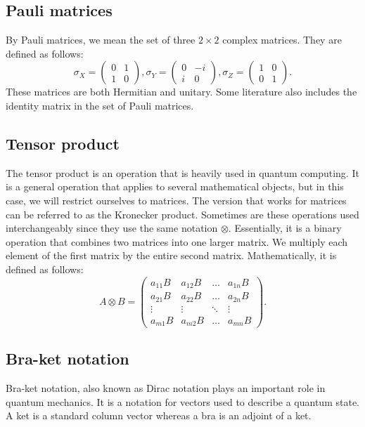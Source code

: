 \subsection*{Pauli matrices}\label{sec:pauli-matrices}
By Pauli matrices, we mean the set of three $2 \times 2$ complex matrices. They are defined as follows:
\begin{equation*}
  \sigma_X = \begin{pmatrix}
    0 & 1 \\
    1 & 0
 \end{pmatrix}, \sigma_Y = \begin{pmatrix}
    0 & -i \\
    i & 0
\end{pmatrix}, \sigma_Z = \begin{pmatrix}
    1 & 0 \\
    0 & 1
\end{pmatrix}\text{.}
\end{equation*}
These matrices are both Hermitian and unitary. Some literature also includes the identity matrix in the set of Pauli matrices. 

\subsection*{Tensor product}
The tensor product is an operation that is heavily used in quantum computing. It is a general operation that applies to several mathematical objects, but in this case, we will restrict ourselves to matrices. The version that works for matrices can be referred to as the Kronecker product. Sometimes are these operations used interchangeably since they use the same notation $\otimes$. Essentially, it is a binary operation that combines two matrices into one larger matrix. We multiply each element of the first matrix by the entire second matrix. Mathematically, it is defined as follows:
\begin{equation*}
  A \otimes B = \begin{pmatrix}
    a_{11}B & a_{12}B & \hdots & a_{1n}B \\
    a_{21}B & a_{22}B & \hdots & a_{2n}B \\
    \vdots & \vdots & \ddots & \vdots \\
    a_{m1}B & a_{m2}B & \hdots & a_{mn}B
  \end{pmatrix}\text{.}
\end{equation*}

\subsection*{Bra-ket notation}
Bra-ket notation, also known as Dirac notation plays an important role in quantum mechanics. It is a notation for vectors used to describe a quantum state. A ket is a standard column vector whereas a bra is an adjoint of a ket. 

